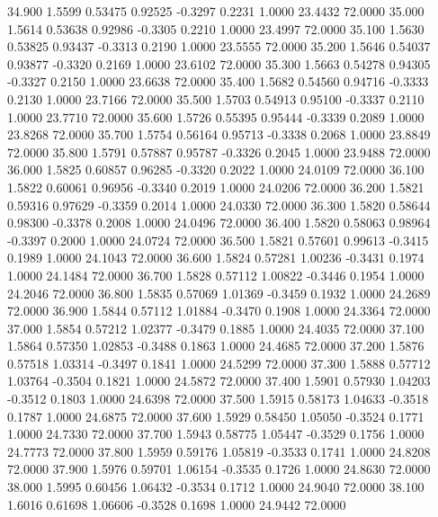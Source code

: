   34.900   1.5599   0.53475   0.92525  -0.3297   0.2231   1.0000  23.4432  72.0000
  35.000   1.5614   0.53638   0.92986  -0.3305   0.2210   1.0000  23.4997  72.0000
  35.100   1.5630   0.53825   0.93437  -0.3313   0.2190   1.0000  23.5555  72.0000
  35.200   1.5646   0.54037   0.93877  -0.3320   0.2169   1.0000  23.6102  72.0000
  35.300   1.5663   0.54278   0.94305  -0.3327   0.2150   1.0000  23.6638  72.0000
  35.400   1.5682   0.54560   0.94716  -0.3333   0.2130   1.0000  23.7166  72.0000
  35.500   1.5703   0.54913   0.95100  -0.3337   0.2110   1.0000  23.7710  72.0000
  35.600   1.5726   0.55395   0.95444  -0.3339   0.2089   1.0000  23.8268  72.0000
  35.700   1.5754   0.56164   0.95713  -0.3338   0.2068   1.0000  23.8849  72.0000
  35.800   1.5791   0.57887   0.95787  -0.3326   0.2045   1.0000  23.9488  72.0000
  36.000   1.5825   0.60857   0.96285  -0.3320   0.2022   1.0000  24.0109  72.0000
  36.100   1.5822   0.60061   0.96956  -0.3340   0.2019   1.0000  24.0206  72.0000
  36.200   1.5821   0.59316   0.97629  -0.3359   0.2014   1.0000  24.0330  72.0000
  36.300   1.5820   0.58644   0.98300  -0.3378   0.2008   1.0000  24.0496  72.0000
  36.400   1.5820   0.58063   0.98964  -0.3397   0.2000   1.0000  24.0724  72.0000
  36.500   1.5821   0.57601   0.99613  -0.3415   0.1989   1.0000  24.1043  72.0000
  36.600   1.5824   0.57281   1.00236  -0.3431   0.1974   1.0000  24.1484  72.0000
  36.700   1.5828   0.57112   1.00822  -0.3446   0.1954   1.0000  24.2046  72.0000
  36.800   1.5835   0.57069   1.01369  -0.3459   0.1932   1.0000  24.2689  72.0000
  36.900   1.5844   0.57112   1.01884  -0.3470   0.1908   1.0000  24.3364  72.0000
  37.000   1.5854   0.57212   1.02377  -0.3479   0.1885   1.0000  24.4035  72.0000
  37.100   1.5864   0.57350   1.02853  -0.3488   0.1863   1.0000  24.4685  72.0000
  37.200   1.5876   0.57518   1.03314  -0.3497   0.1841   1.0000  24.5299  72.0000
  37.300   1.5888   0.57712   1.03764  -0.3504   0.1821   1.0000  24.5872  72.0000
  37.400   1.5901   0.57930   1.04203  -0.3512   0.1803   1.0000  24.6398  72.0000
  37.500   1.5915   0.58173   1.04633  -0.3518   0.1787   1.0000  24.6875  72.0000
  37.600   1.5929   0.58450   1.05050  -0.3524   0.1771   1.0000  24.7330  72.0000
  37.700   1.5943   0.58775   1.05447  -0.3529   0.1756   1.0000  24.7773  72.0000
  37.800   1.5959   0.59176   1.05819  -0.3533   0.1741   1.0000  24.8208  72.0000
  37.900   1.5976   0.59701   1.06154  -0.3535   0.1726   1.0000  24.8630  72.0000
  38.000   1.5995   0.60456   1.06432  -0.3534   0.1712   1.0000  24.9040  72.0000
  38.100   1.6016   0.61698   1.06606  -0.3528   0.1698   1.0000  24.9442  72.0000
